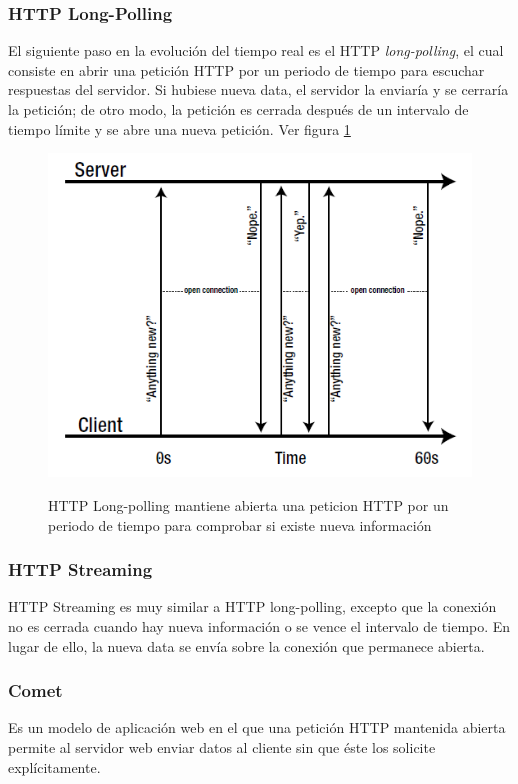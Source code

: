 \subsubsection{HTTP Long-Polling}
El siguiente paso en la evolución del tiempo real es el HTTP \emph{long-polling}, el cual consiste en abrir una petición HTTP por un periodo de tiempo para escuchar respuestas del servidor. Si hubiese nueva data, el servidor la enviaría y se cerraría la petición; de otro modo, la petición es cerrada después de un intervalo de tiempo límite y se abre una nueva petición. Ver figura \ref{fig:http_long_polling}
\begin{figure}[h]
  \centering
  \includegraphics[scale=0.8]{figuras/http_long_polling.png}\\
  \caption{HTTP Long-polling mantiene abierta una peticion HTTP por un periodo de tiempo para comprobar si existe nueva información}\label{fig:http_long_polling}
\end{figure}

\subsubsection{HTTP Streaming}
HTTP Streaming es muy similar a HTTP long-polling, excepto que la conexión no es cerrada cuando hay nueva información o se vence el intervalo de tiempo. En lugar de ello, la nueva data se envía sobre la conexión que permanece abierta.

\subsubsection{Comet}
Es un modelo de aplicación web en el que una petición HTTP mantenida abierta permite al servidor web enviar datos al cliente sin que éste los solicite explícitamente.

